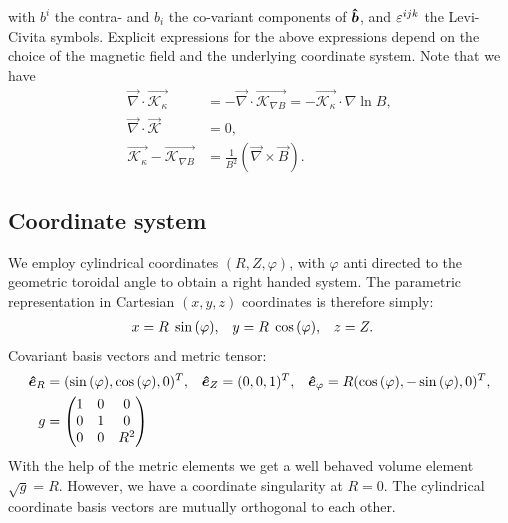 with $b^i$ the contra- and $b_i$ the co-variant components of $\bm{\hat{b}}$, and 
$\varepsilon^{ijk}$ the Levi-Civita symbols.
Explicit expressions for the above expressions
depend on the choice of the magnetic field and the underlying coordinate system.
    Note that we have
\begin{align}
    \vec \nabla \cdot \vec{\mathcal K_\kappa}
    &= -\vec\nabla \cdot \vec{\mathcal K_{\nabla B}} = -\vec{ \mathcal K_\kappa}\cdot\nabla\ln B, \\
    \vec\nabla\cdot\vec{ \mathcal K} &= 0, \\
    \vec{ \mathcal K_\kappa} - \vec{ \mathcal K_{\nabla B}} &= \frac{1}{B^2} (\vec \nabla \times \vec B).
    \label{eq:curl_curvature}
\end{align}
\subsection{Coordinate system}\label{sec:cylmetric}
We employ cylindrical coordinates \( (R,Z,\varphi) \), with \(\varphi\) anti directed to the geometric toroidal angle to
obtain a right handed system. The parametric representation in Cartesian \((x,y,z)\) coordinates is therefore simply:
\begin{align}
 x &= R \hspace{1 mm} \sin{(\varphi)}, &
 y &= R \hspace{1 mm} \cos{(\varphi)}, &
 z &= Z .
\end{align}
Covariant
basis vectors and metric tensor:
\begin{align}
 \bm{\hat{e}}_R      &= (\sin{(\varphi)} ,   \cos{(\varphi)},0)^T, &
 \bm{\hat{e}}_Z      &= ( 0 ,0 ,1 )^T, &
 \bm{\hat{e}}_{\varphi} &= R ( \cos{(\varphi)} , -\sin{(\varphi)} , 0 )^T,
\\
 g &= \begin{pmatrix}
  1 & 0 & 0 \\
  0 & 1 & 0 \\
  0 & 0 & R^2
   \end{pmatrix}
\end{align}
With the help of the metric elements we get a well behaved volume element \(\sqrt{g} = R\). However, we have a coordinate singularity at \(R=0\).
The cylindrical coordinate basis vectors are mutually orthogonal to each other.
